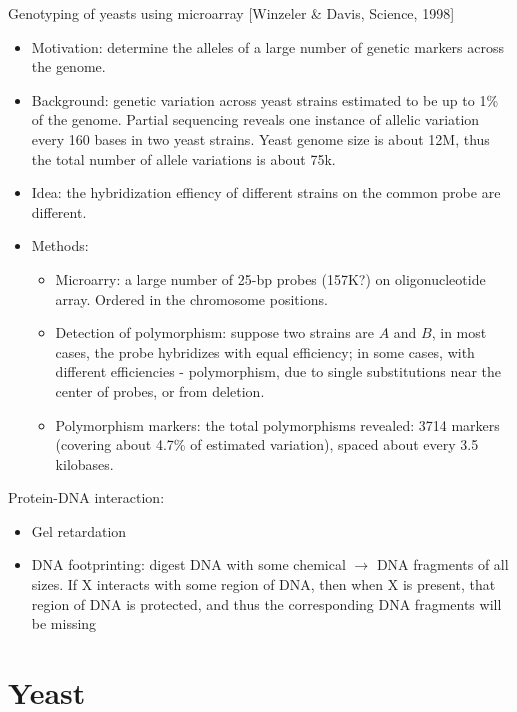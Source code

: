 \documentclass{report}
\begin{document}
Genotyping of yeasts using microarray [Winzeler \& Davis, Science, 1998]
\begin{itemize}
	\item Motivation: determine the alleles of a large number of genetic markers across the genome. 

	\item Background: genetic variation across yeast strains estimated to be up to 1\% of the genome. Partial sequencing reveals one instance of allelic variation every 160 bases in two yeast strains. Yeast genome size is about 12M, thus the total number of allele variations is about 75k. 

	\item Idea: the hybridization effiency of different strains on the common probe are different. 

	\item Methods: 
	\begin{itemize}
		\item Microarry: a large number of 25-bp probes (157K?) on oligonucleotide array. Ordered in the chromosome positions. 
		\item Detection of polymorphism: suppose two strains are $A$ and $B$, in most cases, the probe hybridizes with equal efficiency; in some cases, with different efficiencies - polymorphism, due to single substitutions near the center of probes, or from deletion. 
		\item Polymorphism markers: the total polymorphisms revealed: 3714 markers (covering about 4.7\% of estimated variation), spaced about every 3.5 kilobases. 
	\end{itemize}
\end{itemize}

Protein-DNA interaction: 
\begin{itemize}
	\item Gel retardation
	\item DNA footprinting: digest DNA with some chemical $\rightarrow$ DNA fragments of all sizes. If X interacts with some region of DNA, then when X is present, that region of DNA is protected, and thus the corresponding DNA fragments will be missing
\end{itemize}


\chapter{Yeast}
\end{document}
